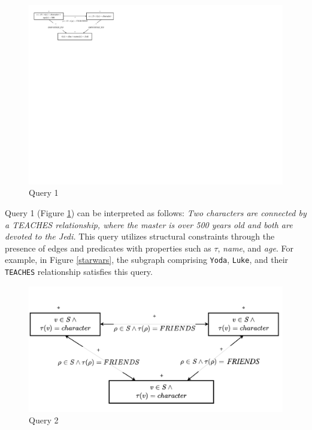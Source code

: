 \documentclass[mathematics,article,submit,pdftex,moreauthors]{Definitions/mdpi}
\begin{document}
\begin{figure}[h!]
    \begin{center}
        \includegraphics[width=\columnwidth]{png/PQG1.pdf}
    \end{center}
    \caption{%
        Query 1
    }%
    \label{pqg1}
\end{figure}

Query 1 (Figure \ref{pqg1}) can be interpreted as follows: \textit{Two characters are connected by a \textit{TEACHES} relationship, where the master is over 500 years old and both are devoted to the Jedi.} This query utilizes structural constraints through the presence of edges and predicates with properties such as $ \tau $, \textit{name}, and \textit{age}. For example, in Figure \ref{starwars}, the subgraph comprising \texttt{Yoda}, \texttt{Luke}, and their \texttt{TEACHES} relationship satisfies this query. 

\begin{figure}[h]
    \begin{center}
        \includegraphics[width=\columnwidth]{png/PQG3.pdf}
    \end{center}
    \caption{%
      Query 2
    }%
    \label{pqg3}
\end{figure}
\end{document}
